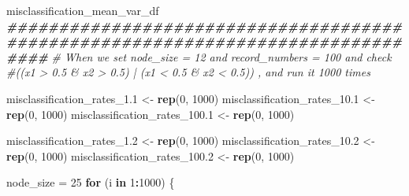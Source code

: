 \documentclass[
]{article}
\newenvironment{Shaded}{\begin{snugshade}}{\end{snugshade}}
\newcommand{\CommentTok}[1]{\textcolor[rgb]{0.56,0.35,0.01}{\textit{#1}}}
\newcommand{\ControlFlowTok}[1]{\textcolor[rgb]{0.13,0.29,0.53}{\textbf{#1}}}
\newcommand{\DecValTok}[1]{\textcolor[rgb]{0.00,0.00,0.81}{#1}}
\newcommand{\DocumentationTok}[1]{\textcolor[rgb]{0.56,0.35,0.01}{\textbf{\textit{#1}}}}
\newcommand{\FloatTok}[1]{\textcolor[rgb]{0.00,0.00,0.81}{#1}}
\newcommand{\FunctionTok}[1]{\textcolor[rgb]{0.13,0.29,0.53}{\textbf{#1}}}
\newcommand{\NormalTok}[1]{#1}
\newcommand{\OtherTok}[1]{\textcolor[rgb]{0.56,0.35,0.01}{#1}}
\newcommand{\SpecialCharTok}[1]{\textcolor[rgb]{0.81,0.36,0.00}{\textbf{#1}}}
\begin{document}
\begin{Shaded}
\begin{Highlighting}[]
\NormalTok{misclassification\_mean\_var\_df}
\DocumentationTok{\#\#\#\#\#\#\#\#\#\#\#\#\#\#\#\#\#\#\#\#\#\#\#\#\#\#\#\#\#\#\#\#\#\#\#\#\#\#\#\#\#\#\#\#\#\#\#\#\#\#\#\#\#\#\#\#\#\#\#\#\#\#\#\#\#\#\#\#\#\#\#\#\#\#\#\#\#\#\#\#}
\CommentTok{\# When we set node\_size = 12 and record\_numbers = 100 and check }
\CommentTok{\#((x1 \textgreater{} 0.5 \& x2 \textgreater{} 0.5) | (x1 \textless{} 0.5 \& x2 \textless{} 0.5)) , and run  it 1000 times}

\NormalTok{misclassification\_rates\_1}\FloatTok{.1} \OtherTok{\textless{}{-}} \FunctionTok{rep}\NormalTok{(}\DecValTok{0}\NormalTok{, }\DecValTok{1000}\NormalTok{)}
\NormalTok{misclassification\_rates\_10}\FloatTok{.1} \OtherTok{\textless{}{-}} \FunctionTok{rep}\NormalTok{(}\DecValTok{0}\NormalTok{, }\DecValTok{1000}\NormalTok{)}
\NormalTok{misclassification\_rates\_100}\FloatTok{.1} \OtherTok{\textless{}{-}} \FunctionTok{rep}\NormalTok{(}\DecValTok{0}\NormalTok{, }\DecValTok{1000}\NormalTok{)}

\NormalTok{misclassification\_rates\_1}\FloatTok{.2} \OtherTok{\textless{}{-}} \FunctionTok{rep}\NormalTok{(}\DecValTok{0}\NormalTok{, }\DecValTok{1000}\NormalTok{)}
\NormalTok{misclassification\_rates\_10}\FloatTok{.2} \OtherTok{\textless{}{-}} \FunctionTok{rep}\NormalTok{(}\DecValTok{0}\NormalTok{, }\DecValTok{1000}\NormalTok{)}
\NormalTok{misclassification\_rates\_100}\FloatTok{.2} \OtherTok{\textless{}{-}} \FunctionTok{rep}\NormalTok{(}\DecValTok{0}\NormalTok{, }\DecValTok{1000}\NormalTok{)}

\NormalTok{node\_size }\OtherTok{=} \DecValTok{25}
\ControlFlowTok{for}\NormalTok{ (i }\ControlFlowTok{in} \DecValTok{1}\SpecialCharTok{:}\DecValTok{1000}\NormalTok{) \{}


\end{Highlighting}
\end{Shaded}
\end{document}
